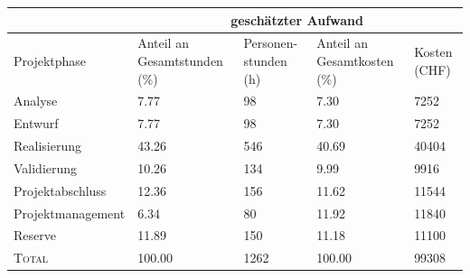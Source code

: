 \begin{center}
    \label{tab:persCost}
    \begin{tabular}{lp{20mm}p{20mm}p{20mm}p{20mm}}
        \toprule
                           & \multicolumn{4}{c}{gesch\"atzter Aufwand} \\
        \midrule
        Projektphase       & Anteil an Gesamtstunden (\%) & Personen-stunden (h) & Anteil an Gesamtkosten (\%) & Kosten (CHF) \\
        \midrule
        Analyse            &                         7.77 &                  98 &                        7.30 &        7252 \\
        Entwurf            &                         7.77 &                  98 &                        7.30 &        7252 \\
        Realisierung       &                        43.26 &                 546 &                       40.69 &       40404 \\
        Validierung        &                        10.26 &                 134 &                        9.99 &        9916 \\
        Projektabschluss   &                        12.36 &                 156 &                       11.62 &       11544 \\
        Projektmanagement  &                         6.34 &                  80 &                       11.92 &       11840 \\
        Reserve            &                        11.89 &                 150 &                       11.18 &       11100 \\
        \midrule
        \textsc{Total}     &                       100.00 &                1262 &                      100.00 &       99308 \\
        \bottomrule
    \end{tabular}
\end{center}
